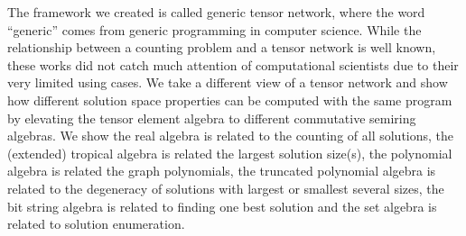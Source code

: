\documentclass[a4paper]{article}
\newcommand{\<}{\langle}
\renewcommand{\>}{\rangle}
\begin{document}
The framework we created is called generic tensor network, where the word ``generic'' comes from generic programming in computer science.
While the relationship between a counting problem and a tensor network is well known, these works did not catch much attention of computational scientists due to their very limited using cases.
We take a different view of a tensor network and show how different solution space properties can be computed with the same program by elevating the tensor element algebra to different commutative semiring algebras. %
We show the real algebra is related to the counting of all solutions, the (extended) tropical algebra is related the largest solution size(s), the polynomial algebra is related the graph polynomials, the truncated polynomial algebra is related to the degeneracy of solutions with largest or smallest several sizes, the bit string algebra is related to finding one best solution and the set algebra is related to solution enumeration.

\end{document}
